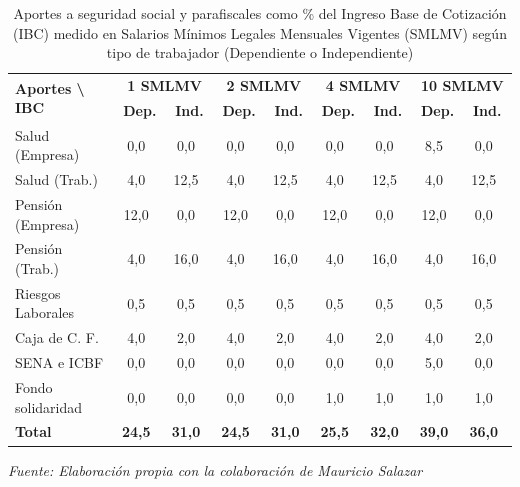 \begin{table}[h!]
\centering
\caption{Aportes a seguridad social y parafiscales como \% del Ingreso Base de Cotización (IBC) medido en Salarios Mínimos Legales Mensuales Vigentes (SMLMV) según tipo de trabajador (Dependiente o Independiente)}
\label{tab:aportes_colombia}
\begin{tabular}{|l|cc|cc|cc|cc|}
\hline
\multirow{2}{*}{\textbf{Aportes \textbackslash{} IBC}} & \multicolumn{2}{c}{\textbf{1 SMLMV}} & \multicolumn{2}{|c|}{\textbf{2 SMLMV}} & \multicolumn{2}{|c|}{\textbf{4 SMLMV}} & \multicolumn{2}{|c|}{\textbf{10 SMLMV}} \\
& \textbf{Dep.} & \textbf{Ind.} & \textbf{Dep.} & \textbf{Ind.} & \textbf{Dep.} & \textbf{Ind.} & \textbf{Dep.} & \textbf{Ind.} \\ \hline
Salud (Empresa)     & 0,0\  & 0,0\  & 0,0\  & 0,0\  & 0,0\  & 0,0\  & 8,5\  & 0,0\  \\
Salud (Trab.)  & 4,0\  & 12,5\ & 4,0\  & 12,5\ & 4,0\  & 12,5\ & 4,0\  & 12,5\ \\
Pensión (Empresa)   & 12,0\ & 0,0\  & 12,0\ & 0,0\  & 12,0\ & 0,0\  & 12,0\ & 0,0\  \\
Pensión (Trab.) & 4,0\  & 16,0\ & 4,0\  & 16,0\ & 4,0\  & 16,0\ & 4,0\  & 16,0\ \\
Riesgos Laborales        & 0,5\  & 0,5\  & 0,5\  & 0,5\  & 0,5\  & 0,5\  & 0,5\  & 0,5\  \\
Caja de C. F.     & 4,0\  & 2,0\  & 4,0\  & 2,0\  & 4,0\  & 2,0\  & 4,0\  & 2,0\  \\
SENA e ICBF               & 0,0\  & 0,0\  & 0,0\  & 0,0\  & 0,0\  & 0,0\  & 5,0\  & 0,0\  \\
Fondo solidaridad        & 0,0\  & 0,0\  & 0,0\  & 0,0\  & 1,0\  & 1,0\  & 1,0\  & 1,0\  \\ \hline
\textbf{Total}           & \textbf{24,5}\ & \textbf{31,0}\ & \textbf{24,5}\ & \textbf{31,0}\ & \textbf{25,5}\ & \textbf{32,0}\ & \textbf{39,0}\ & \textbf{36,0}\ \\ \hline
\end{tabular}
\vspace{0.1cm} \par \footnotesize{\textit{Fuente: Elaboración propia con la colaboración de Mauricio Salazar}}
\end{table}

